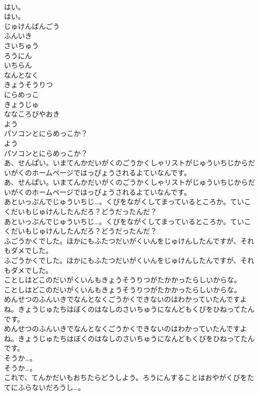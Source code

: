 \documentclass[8pt]{extreport}
\begin{document}
\begin{CJK}{UTF8}{min}
\\	はい。
\\	はい。
\\	じゅけんばんごう
\\	ふんいき
\\	さいちゅう
\\	ろうにん
\\	いちらん
\\	なんとなく
\\	きょうそうりつ
\\	にらめっこ
\\	きょうじゅ
\\	ななころびやおき
\\	よう
\\	パソコンとにらめっこか？
\\	よう
\\	パソコンとにらめっこか？
\\	あ、せんぱい。いまてんかだいがくのごうかくしゃリストがじゅういちじからだいがくのホームページではっぴょうされるよていなんです。
\\	あ、せんぱい。いまてんかだいがくのごうかくしゃリストがじゅういちじからだいがくのホームページではっぴょうされるよていなんです。
\\	あといっぷんでじゅういちじ…。くびをながくしてまっているところか。ていこくだいもじゅけんしたんだろ？どうだったんだ？
\\	あといっぷんでじゅういちじ…。くびをながくしてまっているところか。ていこくだいもじゅけんしたんだろ？どうだったんだ？
\\	ふごうかくでした。ほかにもふたつだいがくいんをじゅけんしたんですが、それもダメでした。
\\	ふごうかくでした。ほかにもふたつだいがくいんをじゅけんしたんですが、それもダメでした。
\\	ことしはどこのだいがくいんもきょうそうりつがたかかったらしいからな。
\\	ことしはどこのだいがくいんもきょうそうりつがたかかったらしいからな。
\\	めんせつのふんいきでなんとなくごうかくできないのはわかっていたんですよね。きょうじゅたちはぼくのはなしのさいちゅうになんどもくびをひねってたんです。
\\	めんせつのふんいきでなんとなくごうかくできないのはわかっていたんですよね。きょうじゅたちはぼくのはなしのさいちゅうになんどもくびをひねってたんです。
\\	そうか…。
\\	そうか…。
\\	これで、てんかだいもおちたらどうしよう。ろうにんすることはおやがくびをたてにふらないだろうし…。

\end{CJK}
\end{document}
